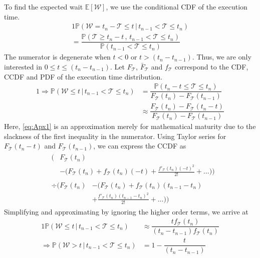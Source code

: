 To find  the expected wait  $\mathbb{E}[\mathcal{W}]$, we use the conditional \gls{CDF} of the execution time.
\begin{alignat}{1}
\mathbb{P}(\mathcal{W}=t_n-\mathcal{T}\leq t\,\big\vert\,t_{n-1}<\mathcal{T}\leq t_n)\nonumber\\
=\dfrac{\mathbb{P}(\mathcal{T}\geq t_n-t\,,\,t_{n-1}<\mathcal{T}\leq t_n)}{\mathbb{P}(t_{n-1}<\mathcal{T}\leq t_n)}
\end{alignat}
The numerator is degenerate when $t\!<\!0$ or $t\!>\!(t_n\!-\!t_{n-1})$.
Thus, we are only interested in $0\!\leq\!t\!\leq\! (t_n-t_{n-1})$.
Let $F_{\mathcal{T}}$, $\bar{F}_{\mathcal{T}}$ and $f_{\mathcal{T}}$ correspond to the \gls{CDF}, \gls{CCDF} and \gls{PDF} of the execution time distribution.
\begin{alignat}{1}
\!\!\!\Rightarrow\mathbb{P}(\mathcal{W}\leq t\,\big\vert\,t_{n-1}<\mathcal{T}\leq t_n)&=\dfrac{\mathbb{P}(t_n-t\leq\mathcal{T}\leq t_n)}{F_\mathcal{T}(t_n)-F_\mathcal{T}(t_{n-1})}\nonumber\\
&\approx\dfrac{F_\mathcal{T}(t_n)-F_\mathcal{T}(t_{n}-t)}{F_\mathcal{T}(t_n)-F_\mathcal{T}(t_{n-1})}\label{eq:Apx1}
\end{alignat}
Here, \cref{eq:Apx1} is an approximation merely for mathematical maturity due to the slackness of the first inequality in the numerator.
Using Taylor series for $F_\mathcal{T}(t_{n}-t)$ and $F_\mathcal{T}(t_{n-1})$, we can express the \gls{CCDF} as
\begin{equation}
    \begin{split}
        &\begin{split}
            \Big(&F_\mathcal{T}(t_n)\\
            &-\big(F_\mathcal{T}(t_n)+f_\mathcal{T}(t_n)(-t)+\frac{f'_\mathcal{T}(t_n)(-t)^2}{2!}+\dots\big)\Big)
        \end{split}\\
        &\begin{split}
            \div
            \Big(F_\mathcal{T}(t_n)&-\big(F_\mathcal{T}(t_n)+f_\mathcal{T}(t_n)(t_{n-1}-t_n)\\
            &+\frac{f'_\mathcal{T}(t_n)(t_{n-1}-t_n)^2}{2!}+\dots\big)\Big)\label{eq:ccdf}
        \end{split}
    \end{split}
\end{equation}
Simplifying and approximating by ignoring the higher order terms, we arrive at
\begin{alignat}{1}
\mathbb{P}(\mathcal{W}\leq t\,\big\vert\,t_{n-1}<\mathcal{T}\leq t_n)&\approx\dfrac{tf_\mathcal{T}(t_n)}{(t_{n}-t_{n-1})f_\mathcal{T}(t_n)}\label{eq:Apx2}\\
\Rightarrow\mathbb{P}(\mathcal{W}> t\,|\,t_{n-1}<\mathcal{T}\leq t_n)&= 1-\dfrac{t}{(t_{n}-t_{n-1})}\nonumber
\end{alignat}

